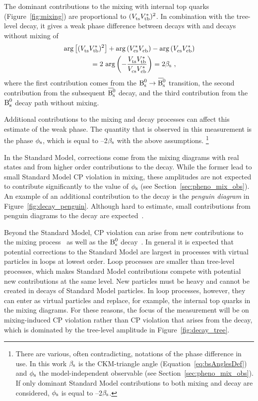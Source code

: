The dominant contributions to the \BsBsbar{} mixing with internal top quarks (Figure~\ref{fig:mixing}) are proportional to
$(\Vts\Vtb[*])^2$. In combination with the tree-level decay, it gives a weak phase difference between decays with and decays without mixing
of
\begin{equation}
  \label{eq:betasCKM}
  \begin{split}
    &\arg\left[(\Vts\Vtb[*])^2\right] + \arg\left(\Vcs[*]\Vcb\right) - \arg\left(\Vcs\Vcb[*]\right) \\
    &\qquad\qquad= 2\,\arg\left(-\frac{\Vts\Vtb[*]}{\Vcs\Vcb[*]}\right) = 2\bs
    \ ,
  \end{split}
\end{equation}
where the first contribution comes from the $\Bs\to\Bsbar$ transition, the second contribution from the subsequent $\Bsbar$ decay, and the
third contribution from the $\text{B}_\text{s}^\text{0}$ decay path without mixing.

Additional contributions to the mixing and decay processes can affect this estimate of the weak phase. The quantity that is observed in
this measurement is the phase $\phi_\text{s}$, which is equal to --2$\beta_\text{s}$ with the above assumptions.%
\footnote{There are various, often contradicting, notations of the phase difference in use. In this work $\beta_\text{s}$ is the CKM-triangle angle
(Equation~\ref{eq:bsAnglesDef}) and $\phi_\text{s}$ the model-independent observable (see Section~\ref{sec:pheno_mix_obs}). If only dominant
Standard Model contributions to both mixing and decay are considered, $\phi_\text{s}$ is equal to --2$\beta_\text{s}$.}

In the Standard Model, corrections come from the mixing diagrams with real states and from higher order contributions to the decay.  While
the former lead to small Standard Model CP violation in mixing, these amplitudes are not expected to contribute significantly to the value
of $\phi_\text{s}$ (see Section~\ref{sec:pheno_mix_obs}). An example of an additional contribution to the decay is the \emph{penguin diagram} in
Figure~\ref{fig:decay_penguin}. Although hard to estimate, small contributions from penguin diagrams to the decay are
expected~\cite{Faller:2008gt,*Bhattacharya:2012ph}.

Beyond the Standard Model, CP violation can arise from new contributions to the \BsBsbar{} mixing
process~\cite{Nir:1990hj,*Silverman:1998uj,*Ball:1999yi,*Dunietz:2000cr,Buras:2009if} as well as the $\text{B}_\text{s}^\text{0}$
decay~\cite{Chiang:2009ev,*Datta:2009fk}. In general it is expected that potential corrections to the Standard Model are largest in
processes with virtual particles in loops at lowest order. Loop processes are smaller than tree-level processes, which makes Standard Model
contributions compete with potential new contributions at the same level. New particles must be heavy and cannot be created in decays of
Standard Model particles. In loop processes, however, they can enter as virtual particles and replace, for example, the internal top quarks
in the \BsBsbar{} mixing diagrams. For these reasons, the focus of the measurement will be on mixing-induced CP violation rather than CP
violation that arises from the \BstoJpsiphi{} decay, which is dominated by the tree-level amplitude in Figure~\ref{fig:decay_tree}.

